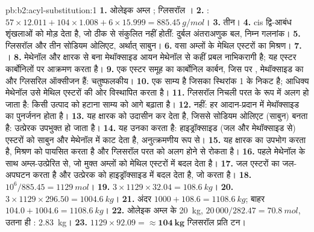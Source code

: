 \begin{solution}{pb:b2:acyl-substitution:1}
\textbf{1.} ओलेइक अम्ल ; ग्लिसरॉल ।
\textbf{2.} : $57 \times 12.011 + 104 \times 1.008 + 6 \times 15.999 = \qty{885.45}{g/mol}$।
\textbf{3.} तीन।
\textbf{4.} cis द्वि-आबंध शृंखलाओं को मोड़ देता है, जो ठीक से संकुलित नहीं होतीं: दुर्बल अंतराअणुक बल,
निम्न गलनांक।
\textbf{5.} ग्लिसरॉल और तीन सोडियम ओलिएट, अर्थात् साबुन।
\textbf{6.} वसा अम्लों के मेथिल एस्टरों का मिश्रण।
\textbf{7.} ।
\textbf{8.} मेथेनॉल और क्षारक से बना मेथॉक्साइड आयन मेथेनॉल से कहीं प्रबल नाभिकरागी है;
यह एस्टर कार्बोनिलों पर आक्रमण करता है।
\textbf{9.} एक एस्टर समूह का कार्बोनिल कार्बन, जिस पर , मेथॉक्साइड का  और
ग्लिसरिल ऑक्सीजन हैं: चतुष्फलकीय।
\textbf{10.}  एक साम्य है जिसका स्थिरांक 1 के निकट है; आधिक्य मेथेनॉल उसे
मेथिल एस्टरों की ओर विस्थापित करता है।
\textbf{11.} ग्लिसरॉल निचली परत के रूप में अलग हो जाता है: किसी उत्पाद को हटाना साम्य को आगे बढ़ाता है।
\textbf{12.} नहीं: हर आदान-प्रदान में मेथॉक्साइड का पुनर्जनन होता है।
\textbf{13.} यह क्षारक को उदासीन कर देता है, जिससे सोडियम ओलिएट (साबुन) बनता है: उत्प्रेरक उपभुक्त हो जाता है।
\textbf{14.} यह उनका  करता है: हाइड्रॉक्साइड (जल और मेथॉक्साइड से) एस्टरों को साबुन और
मेथेनॉल में काट देता है, अनुत्क्रमणीय रूप से।
\textbf{15.} यह क्षारक का उपभोग करता है, मिश्रण को पायसित करता है और ग्लिसरॉल परत को अलग होने से रोकता है।
\textbf{16.} पहले मेथेनॉल के साथ अम्ल-उत्प्रेरित  से, जो मुक्त अम्लों को
मेथिल एस्टरों में बदल देता है।
\textbf{17.} जल एस्टरों का जल-अपघटन करता है और उत्प्रेरक को हाइड्रॉक्साइड में बदल देता है, जो  करता है।
\textbf{18.} $10^6/885.45 = \qty{1129}{mol}$।
\textbf{19.} $3 \times 1129 \times 32.04 = \qty{108.6}{kg}$।
\textbf{20.} $3 \times 1129 \times 296.50 = \qty{1004.6}{kg}$।
\textbf{21.} अंदर $1000 + 108.6 = \qty{1108.6}{kg}$; बाहर $104.0 + 1004.6 = \qty{1108.6}{kg}$।
\textbf{22.} ओलेइक अम्ल के \qty{20}{kg}, $20\,000/282.47 = \qty{70.8}{mol}$, उतना ही :
\qty{2.83}{kg}।
\textbf{23.} $1129 \times 92.09 = \boldsymbol{\approx \qty{104}{kg}}$ ग्लिसरॉल प्रति टन।
\end{solution}

